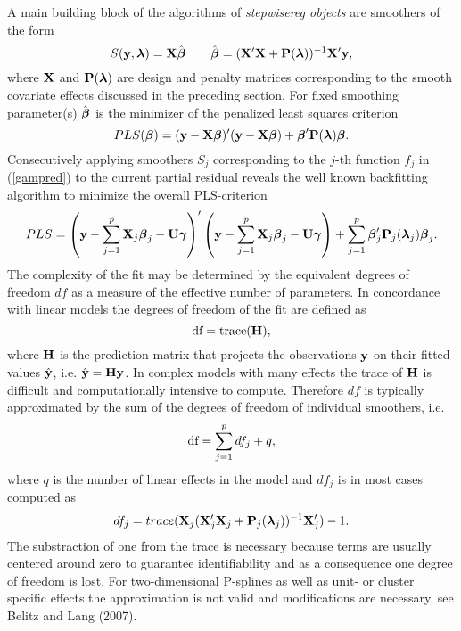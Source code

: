 \documentclass[11pt,a4paper,twoside]{bayesxarticle}
\begin{document}
A main building block of the algorithms of {\em stepwisereg objects} are  smoothers of the form
$$
S(\mathbf{y},\boldsymbol{\lambda}) = \mathbf{X} \hat{\boldsymbol{\beta}} \qquad \hat{\boldsymbol{\beta}} = (\mathbf{X}'\mathbf{X} + \mathbf{P}(\boldsymbol{\lambda}))^{-1}\mathbf{X}' \mathbf{y},
$$
where $\mathbf{X}$ and $\mathbf{P}(\boldsymbol{\lambda})$ are design and penalty matrices corresponding to
the smooth covariate effects discussed in the preceding section.
For fixed smoothing parameter(s) $\hat{\boldsymbol{\beta}}$ is the minimizer of the penalized least squares criterion
$$
PLS(\boldsymbol{\beta}) = (\mathbf{y}-\mathbf{X} \boldsymbol{\beta})' (\mathbf{y}-\mathbf{X} \boldsymbol{\beta}) + \boldsymbol{\beta}' \mathbf{P}(\boldsymbol{\lambda}) \boldsymbol{\beta}.
$$
Consecutively applying smoothers $S_j$ corresponding to the $j$-th function $f_j$ in (\ref{gampred}) to
the current partial residual reveals the well known backfitting
algorithm to minimize the overall PLS-criterion
$$
PLS = \left(\mathbf{y}-\sum_{j=1}^{p}\mathbf{X}_j \boldsymbol{\beta}_j  - \mathbf{U} \boldsymbol{\gamma} \right)'
\left(\mathbf{y}-\sum_{j=1}^{p}\mathbf{X}_j \boldsymbol{\beta}_j - \mathbf{U} \boldsymbol{\gamma}  \right) +
\sum_{j=1}^{p} \boldsymbol{\beta}_j' \mathbf{P}_j(\boldsymbol{\lambda}_j) \boldsymbol{\beta}_j.
$$
The complexity of the fit may be determined by the equivalent degrees of freedom $df$ as a measure of the effective number of parameters.
In concordance with linear models the degrees of freedom of the fit are defined as
$$
\mbox{df} = \mbox{trace} (\mathbf{H}),
$$
where $\mathbf{H}$ is the prediction matrix that projects the observations $\mathbf{y}$ on their fitted values $\hat{\mathbf{y}}$, i.e.
$\hat {\mathbf{y}} = \mathbf{H} \mathbf{y}$. In complex models with many effects the trace of $\mathbf{H}$ is difficult and computationally intensive to compute.
Therefore $df$ is typically approximated by the sum of the degrees of freedom of individual smoothers, i.e.
$$
\mbox{df} = \sum_{j=1}^{p} df_j + q,
$$
where $q$ is the number of linear effects in the model and  $df_j$ is in most cases computed as
\begin{equation}
\label{df_approx}
df_j = trace (\Xvec_j (\Xvec_j'\Xvec_j + \Pvec_j(\lambdavec_j))^{-1}\Xvec_j')-1.
\end{equation}
The substraction of one from the trace is necessary because terms
are usually centered around zero to guarantee identifiability and as
a consequence one degree of freedom is lost. For two-dimensional
P-splines as well as unit- or cluster specific effects the
approximation is not valid and modifications are necessary, see
Belitz and Lang (2007).
\end{document}

